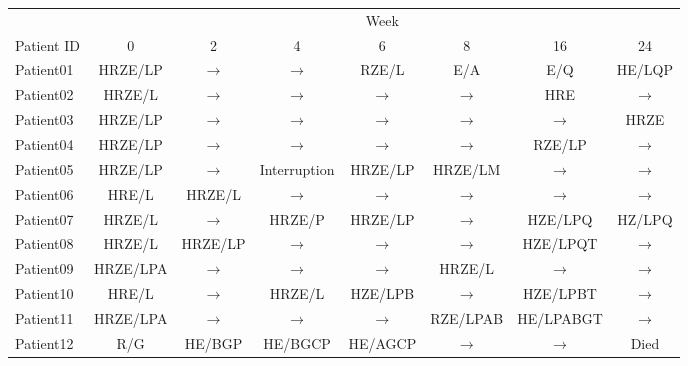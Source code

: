 \documentclass[12pt, oneside]{article}   	%
\begin{document}
\begin{table}
   \centering
   \begin{tabular}{@{} lccccccc @{}} %
      \toprule
       &  &  &  & Week & & & \\
      \cmidrule(l){2-8} %
      Patient ID & 0 & 2 & 4 & 6 & 8 & 16 & 24 \\
      \midrule
      Patient01 & HRZE/LP & $\rightarrow$ & $\rightarrow$ & RZE/L & E/A & E/Q & HE/LQP \\
      Patient02 & HRZE/L & $\rightarrow$ & $\rightarrow$ & $\rightarrow$ & $\rightarrow$ & HRE & $\rightarrow$ \\
      Patient03 & HRZE/LP & $\rightarrow$ & $\rightarrow$ & $\rightarrow$ & $\rightarrow$ & $\rightarrow$ & HRZE \\
      Patient04 & HRZE/LP & $\rightarrow$ & $\rightarrow$ & $\rightarrow$ & $\rightarrow$  & RZE/LP & $\rightarrow$ \\
      Patient05 & HRZE/LP & $\rightarrow$ & Interruption & HRZE/LP & HRZE/LM & $\rightarrow$ & $\rightarrow$ \\
      Patient06 & HRE/L & HRZE/L & $\rightarrow$ & $\rightarrow$ & $\rightarrow$ & $\rightarrow$ & $\rightarrow$ \\
      Patient07 & HRZE/L & $\rightarrow$ & HRZE/P & HRZE/LP & $\rightarrow$ & HZE/LPQ & HZ/LPQ \\
      Patient08 & HRZE/L & HRZE/LP & $\rightarrow$ & $\rightarrow$ & $\rightarrow$ & HZE/LPQT & $\rightarrow$ \\
      Patient09 & HRZE/LPA & $\rightarrow$  & $\rightarrow$  & $\rightarrow$  & HRZE/L & $\rightarrow$  & $\rightarrow$ \\
      Patient10 & HRE/L & $\rightarrow$  & HRZE/L & HZE/LPB & $\rightarrow$ & HZE/LPBT & $\rightarrow$ \\
      Patient11 & HRZE/LPA & $\rightarrow$ & $\rightarrow$ & $\rightarrow$ & RZE/LPAB & HE/LPABGT & $\rightarrow$ \\
      Patient12 & R/G & HE/BGP & HE/BGCP & HE/AGCP & $\rightarrow$ & $\rightarrow$ & Died\\
      \bottomrule
   \end{tabular}
  \label{tab:treat}
\end{table}
\end{document}
